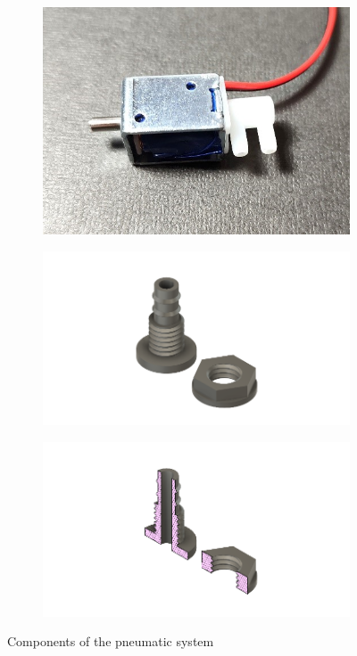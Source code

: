\documentclass[twoside]{article}
\begin{document}
\begin{figure}[H]
	\begin{subfigure}[b]{0.33\linewidth}
		\centering
		\includegraphics[width=\textwidth]{solenoid valve}
	\end{subfigure}%
	\begin{subfigure}[b]{0.33\linewidth}
		\centering		
		\includegraphics[width=\textwidth]{valve}
	\end{subfigure}%
	\begin{subfigure}[b]{0.33\linewidth}
		\centering
		\includegraphics[width=\textwidth]{valve_section}
	\end{subfigure}%
	\caption{Components of the pneumatic system}
\end{figure}
\end{document}
